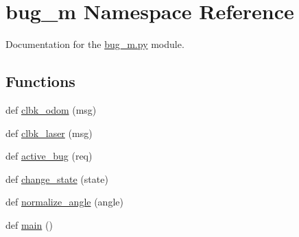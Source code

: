 \hypertarget{namespacebug__m}{}\section{bug\+\_\+m Namespace Reference}
\label{namespacebug__m}


Documentation for the \hyperlink{bug__m_8py}{bug\+\_\+m.\+py} module.  


\subsection*{Functions}
\begin{DoxyCompactItemize}
\item 
def \hyperlink{namespacebug__m_a27cfd2a326148157d3e5e0affbe763f3}{clbk\+\_\+odom} (msg)
\item 
def \hyperlink{namespacebug__m_a6ab3d92b5b6ea12eaa52bf21cfa111f1}{clbk\+\_\+laser} (msg)
\item 
def \hyperlink{namespacebug__m_a8da54e1a34cc6f4da728288cf8bd4e5f}{active\+\_\+bug} (req)
\item 
def \hyperlink{namespacebug__m_aca19305feae5c5489e7452e921fcbd9c}{change\+\_\+state} (state)
\item 
def \hyperlink{namespacebug__m_a6547c5ebcd1d3aa3e104a5b573e47862}{normalize\+\_\+angle} (angle)
\item 
def \hyperlink{namespacebug__m_a357589ad533151302b9fa9a893833382}{main} ()
\end{DoxyCompactItemize}
